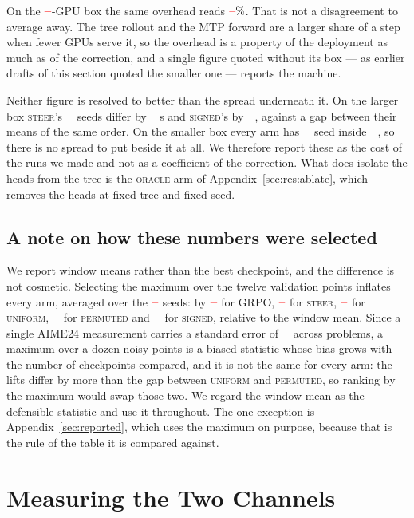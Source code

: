 \documentclass[11pt]{article}
\providecommand{\PENDING}{\textcolor{red}{\textbf{--}}}
\newcommand{\num}[1]{\ifcsname #1\endcsname\csname #1\endcsname\else\PENDING\fi}
\begin{document}
On the $\num{Costgpuslo}$-GPU box the same overhead reads
$\num{Costoverheadlo}\%$. That is not a disagreement to average away. The tree
rollout and the MTP forward are a larger share of a step when fewer GPUs serve it, so
the overhead is a property of the deployment as much as of the correction, and a single
figure quoted without its box --- as earlier drafts of this section quoted the smaller
one --- reports the machine.

Neither figure is resolved to better than the spread underneath it. On the larger box
\textsc{steer}'s $\num{Costnsteerhi}$ seeds differ by $\num{Costrsteerhi}$\,s and
\textsc{signed}'s by $\num{Costrsignedhi}$, against a gap between their means of the same
order. On the smaller box every arm has $\num{Costnsteerlo}$ seed inside
$\num{Seedset}$, so there is no spread to put beside it at all. We therefore
report these as the cost of the runs we made and not as a coefficient of the correction.
What does isolate the heads from the tree is the \textsc{oracle} arm of
Appendix~\ref{sec:res:ablate}, which removes the heads at fixed tree and fixed seed.

\subsection{A note on how these numbers were selected}
\label{sec:res:selection}

We report window means rather than the best checkpoint, and the difference is not
cosmetic. Selecting the maximum over the twelve validation points inflates every arm,
averaged over the $\num{Nseedsused}$ seeds: by $\num{Rgrposellift}$ for GRPO,
$\num{Rsteersellift}$ for \textsc{steer}, $\num{Runiformsellift}$ for
\textsc{uniform}, $\num{Rpermutedsellift}$ for \textsc{permuted} and
$\num{Rsignedsellift}$ for \textsc{signed}, relative to the window mean.
Since a single AIME24 measurement carries a standard error of $\num{SEaime}$ across
problems, a maximum over a dozen noisy points is a biased statistic whose bias grows
with the number of checkpoints compared, and it is not the same for every arm: the
lifts differ by more than the gap between \textsc{uniform} and \textsc{permuted},
so ranking by the maximum would swap those two. We regard the window mean as the
defensible statistic and use it throughout. The one exception is
Appendix~\ref{sec:reported}, which uses the maximum on purpose, because that is the
rule of the table it is compared against.


\section{Measuring the Two Channels}
\label{sec:decomp}
\end{document}
